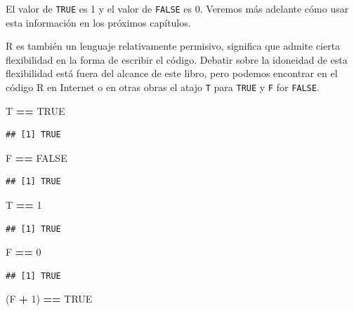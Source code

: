 \documentclass[
]{book}
\newenvironment{Shaded}{\begin{snugshade}}{\end{snugshade}}
\newcommand{\DecValTok}[1]{\textcolor[rgb]{0.00,0.00,0.81}{#1}}
\newcommand{\NormalTok}[1]{#1}
\newcommand{\OperatorTok}[1]{\textcolor[rgb]{0.81,0.36,0.00}{\textbf{#1}}}
\newcommand{\OtherTok}[1]{\textcolor[rgb]{0.56,0.35,0.01}{#1}}
\newcommand{\StringTok}[1]{\textcolor[rgb]{0.31,0.60,0.02}{#1}}
\begin{document}
El valor de \texttt{TRUE} es 1 y el valor de \texttt{FALSE} es 0. Veremos más adelante cómo usar esta información en los próximos capítulos.

R es también un lenguaje relativamente permisivo, significa que admite cierta flexibilidad en la forma de escribir el código. Debatir sobre la idoneidad de esta flexibilidad está fuera del alcance de este libro, pero podemos encontrar en el código R en Internet o en otras obras el atajo \texttt{T} para \texttt{TRUE} y \texttt{F} for \texttt{FALSE}.

\begin{Shaded}
\begin{Highlighting}[]
\NormalTok{T }\OperatorTok{==}\StringTok{ }\OtherTok{TRUE}
\end{Highlighting}
\end{Shaded}

\begin{verbatim}
## [1] TRUE
\end{verbatim}

\begin{Shaded}
\begin{Highlighting}[]
\NormalTok{F }\OperatorTok{==}\StringTok{ }\OtherTok{FALSE}
\end{Highlighting}
\end{Shaded}

\begin{verbatim}
## [1] TRUE
\end{verbatim}

\begin{Shaded}
\begin{Highlighting}[]
\NormalTok{T }\OperatorTok{==}\StringTok{ }\DecValTok{1}
\end{Highlighting}
\end{Shaded}

\begin{verbatim}
## [1] TRUE
\end{verbatim}

\begin{Shaded}
\begin{Highlighting}[]
\NormalTok{F }\OperatorTok{==}\StringTok{ }\DecValTok{0}
\end{Highlighting}
\end{Shaded}

\begin{verbatim}
## [1] TRUE
\end{verbatim}

\begin{Shaded}
\begin{Highlighting}[]
\NormalTok{(F }\OperatorTok{+}\StringTok{ }\DecValTok{1}\NormalTok{) }\OperatorTok{==}\StringTok{ }\OtherTok{TRUE}
\end{Highlighting}
\end{Shaded}
\end{document}
